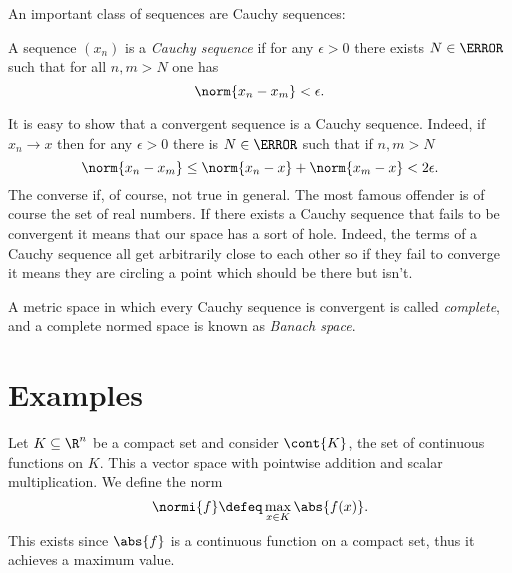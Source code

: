 \documentclass[12pt,oneside]{book}
\begin{document}
An important class of sequences are Cauchy sequences:
\begin{definition}
	A sequence \( (x_n) \) is a \emph{Cauchy sequence} if for any \( \epsilon > 0 \) there
	exists \( N \in \N \) such that for all \( n, m > N \) one has
	\begin{equation*}
		\norm{x_n - x_m} < \epsilon.
	\end{equation*}
\end{definition}
It is easy to show that a convergent sequence is a Cauchy sequence. Indeed, if \( x_n \to
x\) then for any \( \epsilon > 0 \) there is \( N \in \N \) such that if \( n, m > N \)
\begin{equation*}
	\norm{x_n - x_m} \leq \norm{x_n - x} + \norm{x_m - x} < 2\epsilon.
\end{equation*}
The converse if, of course, not true in general. The most famous offender is of course the
set of real numbers. If there exists a Cauchy sequence that fails to be convergent it
means that our space has a sort of hole. Indeed, the terms of a Cauchy sequence all get
arbitrarily close to each other so if they fail to converge it means they are circling a
point which should be there but isn't.  

A metric space in which every Cauchy sequence is convergent is called \emph{complete}, and
a complete normed space is known as \emph{Banach space}.

\section{Examples}
\begin{example}
	Let \( K \subseteq \R^n \) be a compact set and consider \( \cont{K} \), the set of
	continuous functions on \( K \). This a vector space with pointwise addition and scalar
	multiplication. We define the norm 
	\begin{equation*}
		\normi{f} \defeq \max_{x \in K} \abs{f(x)}.
	\end{equation*}
	This exists since \( \abs{f} \) is a continuous function on a compact set, thus it
	achieves a maximum value. 
\end{example}
\end{document}
